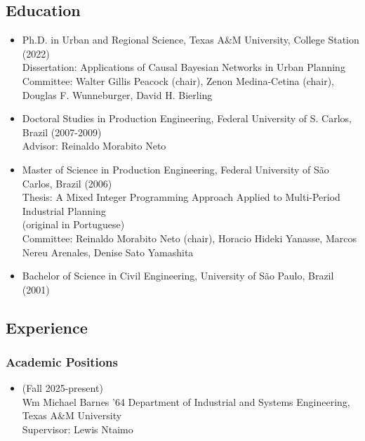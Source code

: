 \documentclass[11pt,oneside]{article}
\begin{document}
\subsection{Education}
\begin{itemize}[leftmargin=40pt, label={-}]
\item {\frutigerregular Ph.D. in Urban and Regional Science}, Texas A\&M University, College Station (2022)\\
      Dissertation: Applications of Causal Bayesian Networks in Urban Planning\\
      Committee: Walter Gillis Peacock (chair), Zenon Medina-Cetina (chair), Douglas F. Wunneburger, David H. Bierling
\item {\frutigerregular Doctoral Studies in Production Engineering}, Federal University of S. Carlos, Brazil (2007-2009)\\
      Advisor: Reinaldo Morabito Neto
\item {\frutigerregular Master of Science in Production Engineering}, Federal University of São Carlos, Brazil (2006)\\
      Thesis: A Mixed Integer Programming Approach Applied to Multi-Period Industrial Planning\\[-2pt]
      {\small (original in Portuguese)}\\
      Committee: Reinaldo Morabito Neto (chair), Horacio Hideki Yanasse, Marcos Nereu Arenales, Denise Sato Yamashita
\item {\frutigerregular Bachelor of Science in Civil Engineering}, University of São Paulo, Brazil (2001)
\end{itemize}

\subsection{Experience}
\subsubsection{Academic Positions}
\begin{itemize}[leftmargin=40pt, label={-}]
\item {} (Fall 2025-present)\\
      {Wm Michael Barnes ’64 Department of Industrial and Systems Engineering, Texas A\&M University}\\
      Supervisor: Lewis Ntaimo
\end{itemize}
\end{document}
